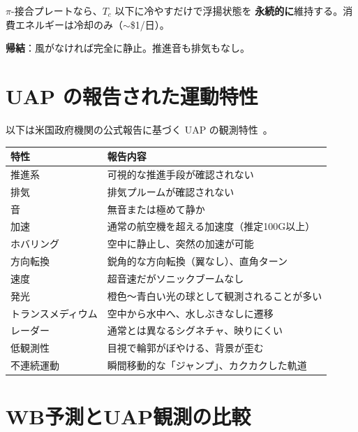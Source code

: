 \documentclass[11pt,a4paper]{article}
\begin{document}
$\pi$-接合プレートなら、$T_c$ 以下に冷やすだけで浮揚状態を
\textbf{永続的に}維持する。消費エネルギーは冷却のみ（$\sim$\$1/日）。

\textbf{帰結}：風がなければ完全に静止。推進音も排気もなし。

\section{UAP の報告された運動特性}

以下は米国政府機関の公式報告に基づく
UAP の観測特性~\cite{ODNI2021,NASA2023}。

\begin{center}
\begin{tabular}{lp{7cm}}
\toprule
特性 & 報告内容 \\
\midrule
推進系 & 可視的な推進手段が確認されない \\
排気 & 排気プルームが確認されない \\
音 & 無音または極めて静か \\
加速 & 通常の航空機を超える加速度（推定100G以上） \\
ホバリング & 空中に静止し、突然の加速が可能 \\
方向転換 & 鋭角的な方向転換（翼なし）、直角ターン \\
速度 & 超音速だがソニックブームなし \\
発光 & 橙色〜青白い光の球として観測されることが多い \\
トランスメディウム & 空中から水中へ、水しぶきなしに遷移 \\
レーダー & 通常とは異なるシグネチャ、映りにくい \\
低観測性 & 目視で輪郭がぼやける、背景が歪む \\
不連続運動 & 瞬間移動的な「ジャンプ」、カクカクした軌道 \\
\bottomrule
\end{tabular}
\end{center}

\section{WB予測とUAP観測の比較}
\end{document}
